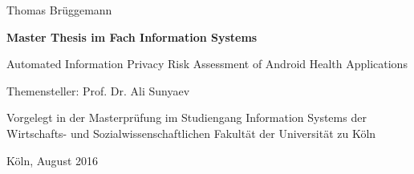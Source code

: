 \vspace*{1mm}

\thispagestyle{empty}
Thomas Brüggemann

\vspace*{23mm}

\begin{center}
\textbf{
    Master Thesis
\linebreak
    im Fach Information Systems}
\end{center}

\vspace*{20mm}

\begin{center}
\LARGE 
    Automated Information Privacy Risk Assessment of Android Health Applications
\end{center}

\vspace*{8mm}

\begin{center}
    Themensteller: Prof. Dr. Ali Sunyaev
\end{center}

\vspace*{12mm}

\begin{center}
    Vorgelegt in der Masterprüfung
\linebreak
    im Studiengang Information Systems
\linebreak
    der Wirtschafts- und Sozialwissenschaftlichen Fakultät
\linebreak
    der Universität zu Köln
\end{center}

\vspace*{30mm}

\begin{center}
Köln, August 2016
\end{center}
